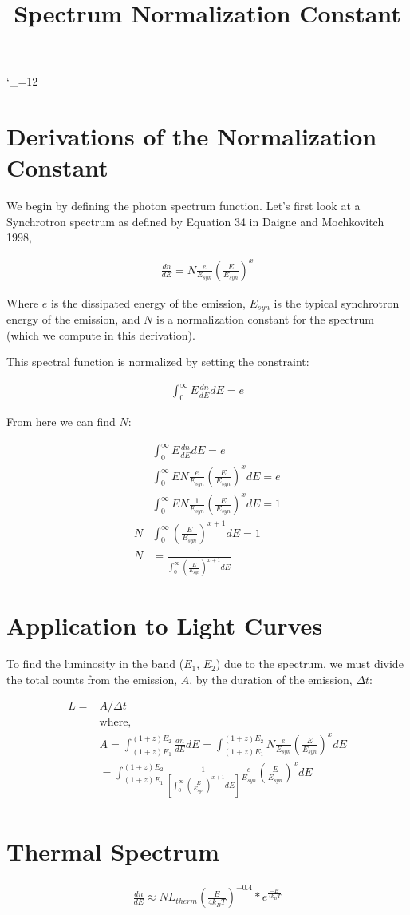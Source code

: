 \documentclass[10pt]{article}
\title{Spectrum Normalization Constant}
\def\upsubscripts{\catcode`\_=12 } \def\normalsubscripts{\catcode`\_=8 }
\begin{document}
\upsubscripts

\section*{Derivations of the Normalization Constant}

We begin by defining the photon spectrum function. Let's first look at a Synchrotron spectrum as defined by Equation 34 in Daigne and Mochkovitch 1998, 

\begin{align}
	\frac{dn}{dE} = N \frac{e}{E_{syn}} \left(\frac{E}{E_{syn}} \right)^{x}
\end{align}

Where $e$ is the dissipated energy of the emission, $E_{syn}$ is the typical synchrotron energy of the emission, and $N$ is a normalization constant for the spectrum (which we compute in this derivation). 

This spectral function is normalized by setting the constraint:

\begin{align}
	\int_0^\infty E \frac{dn}{dE} dE = e
\end{align}

From here we can find $N$:

\begin{align}
	&\int_0^\infty E \frac{dn}{dE} dE = e \\
	&\int_0^\infty E N \frac{e}{E_{syn}} \left(\frac{E}{E_{syn}} \right)^{x} dE = e \\
	&\int_0^\infty E N \frac{1}{E_{syn}} \left(\frac{E}{E_{syn}} \right)^{x} dE = 1 \\
	N &\int_0^\infty \left(\frac{E}{E_{syn}} \right)^{x+1} dE = 1 \\
	N &=  \frac{1}{\int_0^\infty \left(\frac{E}{E_{syn}} \right)^{x+1} dE }
\end{align}

\section*{Application to Light Curves}

To find the luminosity in the band ($E_1$, $E_2$) due to the spectrum, we must divide the total counts from the emission, $A$, by the duration of the emission, $\Delta t$:

\begin{align}
	L =& A/\Delta t\\
	&\text{where,} \\
	& A = \int_{(1+z)E_1}^{(1+z)E_2} \frac{dn}{dE}dE = \int_{(1+z)E_1}^{(1+z)E_2}N \frac{e}{E_{syn}} \left(\frac{E}{E_{syn}} \right)^{x} dE \\
	& =  \int_{(1+z)E_1}^{(1+z)E_2} \frac{1}{\left[\int_0^\infty \left(\frac{E}{E_{syn}} \right)^{x+1} dE \right]} \frac{e}{E_{syn}} \left(\frac{E}{E_{syn}} \right)^{x} dE \\
\end{align}

\section*{Thermal Spectrum}

\begin{align}
	\frac{dn}{dE} \approx N L_{therm} \left(\frac{E}{4k_BT} \right)^{-0.4} * e^{\frac{-E}{4k_BT}}
\end{align}
\end{document}
